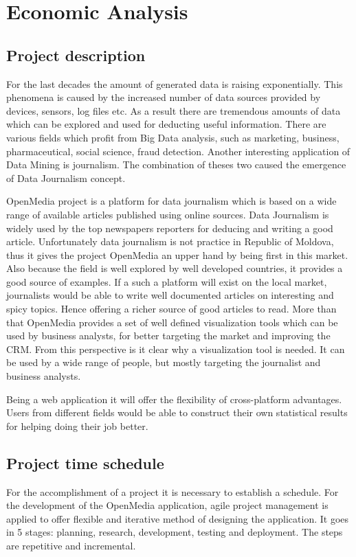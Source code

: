 \section{Economic Analysis}\label{sec:economy}

\subsection{Project description}
For the last decades the amount of generated data is raising exponentially. This phenomena is caused by the increased number of data sources provided by devices, sensors, log files etc. As a result there are tremendous amounts of data which can be explored and used for deducting useful information. There are various fields which profit from Big Data analysis, such as marketing, business, pharmaceutical, social science, fraud detection. Another interesting application of Data Mining is journalism. The combination of theses two caused the emergence of Data Journalism concept.

OpenMedia project is a platform for data journalism which is based on a wide range of available articles published using online sources. Data Journalism is widely used by the top newspapers reporters for deducing and writing a good article. Unfortunately data journalism is not practice in Republic of Moldova, thus it gives the project OpenMedia an upper hand by being first in this market. Also because the field is well explored by well developed countries, it provides a good source of examples. If a such a platform will exist on the local market, journalists would be able to write well documented articles on interesting and spicy topics. Hence offering a richer source of good articles to read. More than that OpenMedia provides a set of well defined visualization tools which can be used by business analysts, for better targeting the market and improving the CRM. From this perspective is it clear why a visualization tool is needed. It can be used by a wide range of people, but mostly targeting the journalist and business analysts.

Being a web application it will offer the flexibility of cross-platform advantages. Users from different fields would be able to construct their own statistical results for helping doing their job better.

\subsection{Project time schedule}
For the accomplishment of a project it is necessary to establish a schedule. For the development of the OpenMedia application, agile project management is applied to offer flexible and iterative method of designing the application. It goes in 5 stages: planning, research, development, testing and deployment. The steps are repetitive and incremental.


